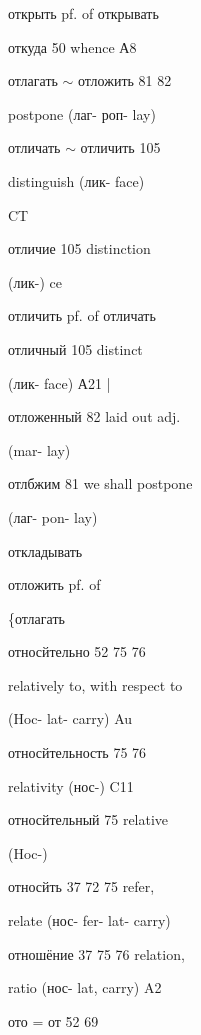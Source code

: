 \clearpage
\thispagestyle{plain}
\begingroup
\cyrillicfont
\fontsize{7.25}{8.25}\selectfont
\setlength{\parindent}{0pt}
\setlength{\parskip}{0pt}
\setlength{\emergencystretch}{1.5em}
\noindent
\begin{minipage}[t]{0.475\textwidth}
\raggedright
\noindent открыть pf. of открывать\par
\noindent откуда 50 whence А8\par
\noindent отлагать $\sim$ отложить 81 82\par
\noindent postpone (лаг- роп- lay)\par
\noindent отличать $\sim$ отличить 105\par
\noindent distinguish (лик- face)\par
\noindent CT\par
\noindent отличие 105 distinction\par
\noindent (лик-) ce\par
\noindent отличить pf. of отличать\par
\noindent отличный 105 distinct\par
\noindent (лик- face) А21 |\par
\noindent отложенный 82 laid out adj.\par
\noindent (mar- lay)\par
\noindent отлбжим 81 we shall postpone\par
\noindent (лаг- pon- lay)\par
\noindent откладывать\par
\noindent отложить pf. of\par
\noindent \{отлагать\par
\noindent относйтельно 52 75 76\par
\noindent relatively to, with respect to\par
\noindent (Hoc- lat- carry) Au\par
\noindent относйтельность 75 76\par
\noindent relativity (нос-) C11\par
\noindent относйтельный 75 relative\par
\noindent (Hoc-)\par
\noindent относйть 37 72 75 refer,\par
\noindent relate (нос- fer- lat- carry)\par
\noindent отношёние 37 75 76 relation,\par
\noindent ratio (нос- lat, carry) A2\par
\noindent ото = от 52 69\par

\end{minipage}
